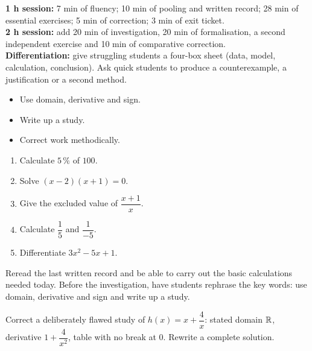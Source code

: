 \ifprof
\begin{methode}
\textbf{1 h session:} 7 min of fluency; 10 min of pooling and written record; 28 min of essential exercises; 5 min of correction; 3 min of exit ticket.\\
\textbf{2 h session:} add 20 min of investigation, 20 min of formalisation, a second independent exercise and 10 min of comparative correction.\\
\textbf{Differentiation:} give struggling students a four-box sheet (data, model, calculation, conclusion). Ask quick students to produce a counterexample, a justification or a second method.
\end{methode}
\fi
{}
\begin{objectifs}\begin{itemize}\item Use domain, derivative and sign.\item Write up a study.\item Correct work methodically.\end{itemize}\end{objectifs}
\begin{automatismes}\begin{enumerate}\item Calculate $5\,\%$ of $100$. \item Solve $(x-2)(x+1)=0$. \item Give the excluded value of $\dfrac{x+1}{x}$. \item Calculate $\dfrac1{5}$ and $\dfrac1{-5}$. \item Differentiate $3x^2-5x+1$. \end{enumerate}\end{automatismes}
\begin{prerequis}Reread the last written record and be able to carry out the basic calculations needed today. Before the investigation, have students rephrase the key words: use domain, derivative and sign and write up a study.\end{prerequis}

\begin{activite}
Correct a deliberately flawed study of $h(x)=x+\dfrac4x$: stated domain $\mathbb{R}$, derivative $1+\dfrac4{x^2}$, table with no break at $0$. Rewrite a complete solution.

\end{activite}

